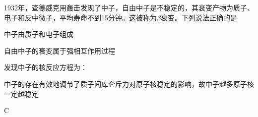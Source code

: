 1932年，查德威克用轰击发现了中子，自由中子是不稳定的，其衰变产物为质子、电子和反中微子，平均寿命不到15分钟。这被称为\(\beta\)衰变。下列说法正确的是\paren[]
\begin{choices}
    \item 中子由质子和电子组成
    \item 自由中子的衰变属于强相互作用过程
    \item 发现中子的核反应方程为：
    \item 中子的存在有效地调节了质子间库仑斥力对原子核稳定的影响，故中子越多原子核一定越稳定
\end{choices}
\begin{answer}
    C
\end{answer}